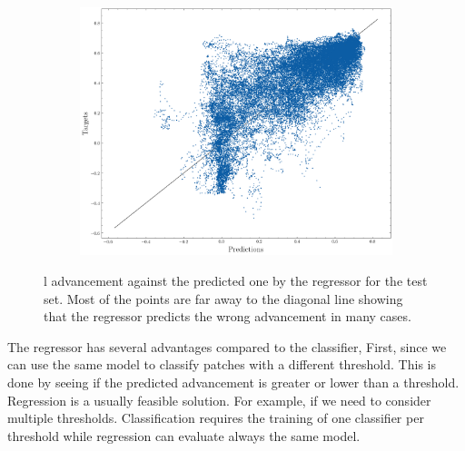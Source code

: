\documentclass[../document.tex]{subfiles}
\begin{document}
\begin{figure}[htbp]
  \centering
  \begin{subfigure}[b]{1\linewidth}
    \includegraphics[width=\linewidth]{../img/4/regression_scatter.png} 
  \end{subfigure}
  \caption{l advancement against the predicted one by the regressor for the test set. Most of the points are far away to the diagonal line showing that the regressor predicts the wrong advancement in many cases.}
  \label{fig : regression-preds-targs}
\end{figure}
The regressor has several advantages compared to the classifier, First, since we can use the same model to classify patches with a different threshold. This is done by seeing if the predicted advancement is greater or lower than a threshold. Regression is a usually feasible solution. For example, if we need to consider multiple thresholds. Classification requires the training of one classifier per threshold while regression can evaluate always the same model.
\end{document}
